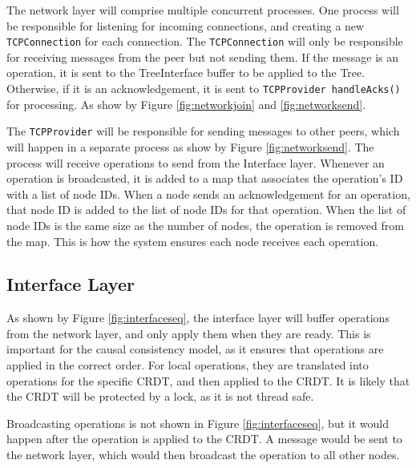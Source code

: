 \documentclass[12pt]{report}
\begin{document}
The network layer will comprise multiple concurrent processes. One process will be responsible for listening for incoming connections, and creating a new \texttt{TCPConnection} for each connection. The \texttt{TCPConnection} will only be responsible for receiving messages from the peer but not sending them. If the message is an operation, it is sent to the TreeInterface buffer to be applied to the Tree. Otherwise, if it is an acknowledgement, it is sent to \texttt{TCPProvider handleAcks()} for processing. As show by Figure \ref{fig:networkjoin} and \ref{fig:networksend}. \par

The \texttt{TCPProvider} will be responsible for sending messages to other peers, which will happen in a separate process as show by Figure \ref{fig:networksend}. The process will receive operations to send from the Interface layer. Whenever an operation is broadcasted, it is added to a map that associates the operation's ID with a list of node IDs. When a node sends an acknowledgement for an operation, that node ID is added to the list of node IDs for that operation. When the list of node IDs is the same size as the number of nodes, the operation is removed from the map. This is how the system ensures each node receives each operation. \par



\subsection{Interface Layer}

As shown by Figure \ref{fig:interfaceseq}, the interface layer will buffer operations from the network layer, and only apply them when they are ready. This is important for the causal consistency model, as it ensures that operations are applied in the correct order. For local operations, they are translated into operations for the specific CRDT, and then applied to the CRDT. It is likely that the CRDT will be protected by a lock, as it is not thread safe. \par

Broadcasting operations is not shown in Figure \ref{fig:interfaceseq}, but it would happen after the operation is applied to the CRDT. A message would be sent to the network layer, which would then broadcast the operation to all other nodes. \par
\end{document}
